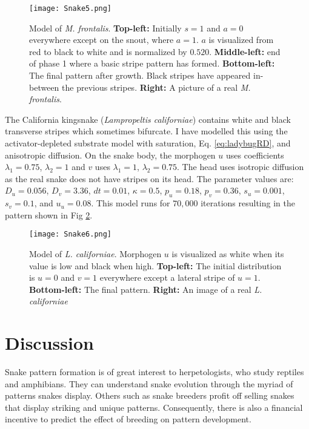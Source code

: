 \begin{figure}[ht]
	\centering
	\texttt{[image: Snake5.png]}
	\caption{Model of \textit{M. frontalis}. \textbf{Top-left:} Initially $s=1$ and $a=0$ everywhere except on the snout, where $a=1$. $a$ is visualized from red to black to white and is normalized by $0.520$. \textbf{Middle-left:} end of phase 1 where a basic stripe pattern has formed. \textbf{Bottom-left:} The final pattern after growth. Black stripes have appeared in-between the previous stripes. \textbf{Right:} A picture of a real \textit{M. frontalis}.}
	\label{fig:Snake5}
\end{figure}

\newpage 

The California kingsnake (\textit{Lampropeltis californiae}) contains white and black transverse stripes which sometimes bifurcate. I have modelled this using the activator-depleted substrate model with saturation, Eq. \ref{eq:ladybugRD}, and anisotropic diffusion. On the snake body, the morphogen $u$ uses coefficients $\lambda_{1}=0.75$, $\lambda_{2}=1$ and $v$ uses $\lambda_{1}=1$, $\lambda_{2}=0.75$. The head uses isotropic diffusion as the real snake does not have stripes on its head. The parameter values are: $D_u=0.056$, $D_v=3.36$, $dt=0.01$, $\kappa=0.5$, $p_u=0.18$, $p_v=0.36$, $s_u=0.001$, $s_v=0.1$, and $u_u=0.08$. This model runs for $70,000$ iterations resulting in the pattern shown in Fig \ref{fig:Snake6}.

\begin{figure}[h]
	\centering
	\texttt{[image: Snake6.png]}
	\caption{Model of \textit{L. californiae}. Morphogen $u$ is visualized as white when its value is low and black when high. \textbf{Top-left:} The initial distribution is $u=0$ and $v=1$ everywhere except a lateral stripe  of $u=1$. \textbf{Bottom-left:} The final pattern. \textbf{Right:} An image of a real \textit{L. californiae}}
	\label{fig:Snake6}
\end{figure}

\newpage

\section{Discussion}
Snake pattern formation is of great interest to herpetologists, who study reptiles and amphibians. They can understand snake evolution through the myriad of patterns snakes display. Others such as snake breeders profit off selling snakes that display striking and unique patterns. Consequently, there is also a financial incentive to predict the effect of breeding on pattern development. 

